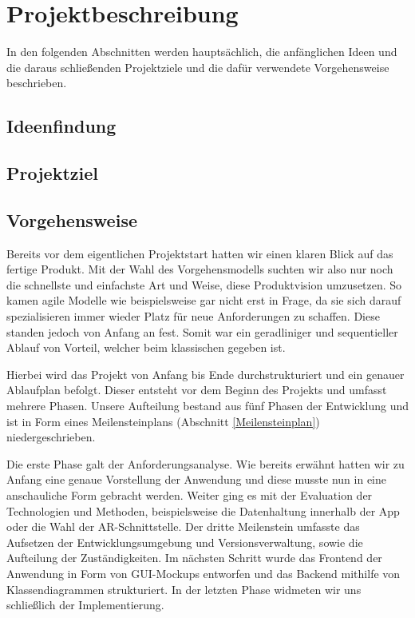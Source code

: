 \chapter{Projektbeschreibung}\label{ch:projektbeschreibung}
In den folgenden Abschnitten werden hauptsächlich, die anfänglichen Ideen und die daraus schließenden Projektziele und die dafür verwendete Vorgehensweise beschrieben.

\section{Ideenfindung}
\section{Projektziel}\label{projektziel}
\section{Vorgehensweise}
Bereits vor dem eigentlichen Projektstart hatten wir einen klaren Blick auf das fertige Produkt.
Mit der Wahl des Vorgehensmodells suchten wir also nur noch die schnellste und einfachste Art und Weise, diese Produktvision umzusetzen. 
So kamen agile Modelle wie beispielsweise  gar nicht erst in Frage, da sie sich darauf spezialisieren immer wieder Platz für neue Anforderungen zu schaffen. 
Diese standen jedoch von Anfang an fest.
Somit war ein geradliniger und sequentieller Ablauf von Vorteil, welcher beim klassischen  gegeben ist. 

Hierbei wird das Projekt von Anfang bis Ende durchstrukturiert und ein genauer Ablaufplan befolgt.
Dieser entsteht vor dem Beginn des Projekts und umfasst mehrere Phasen. 
Unsere Aufteilung bestand aus fünf Phasen der Entwicklung und ist in Form eines Meilensteinplans (Abschnitt \ref{Meilensteinplan}) niedergeschrieben. 

Die erste Phase galt der Anforderungsanalyse. 
Wie bereits erwähnt hatten wir zu Anfang eine genaue Vorstellung der Anwendung und diese musste nun in eine anschauliche Form gebracht werden. 
Weiter ging es mit der Evaluation der Technologien und Methoden, beispielsweise die Datenhaltung innerhalb der App oder die Wahl der AR-Schnittstelle.
Der dritte Meilenstein umfasste das Aufsetzen der Entwicklungsumgebung und Versionsverwaltung, sowie die Aufteilung der Zuständigkeiten.
Im nächsten Schritt wurde das Frontend der Anwendung in Form von GUI-Mockups entworfen und das Backend mithilfe von Klassendiagrammen strukturiert.
In der letzten Phase widmeten wir uns schließlich der Implementierung.
